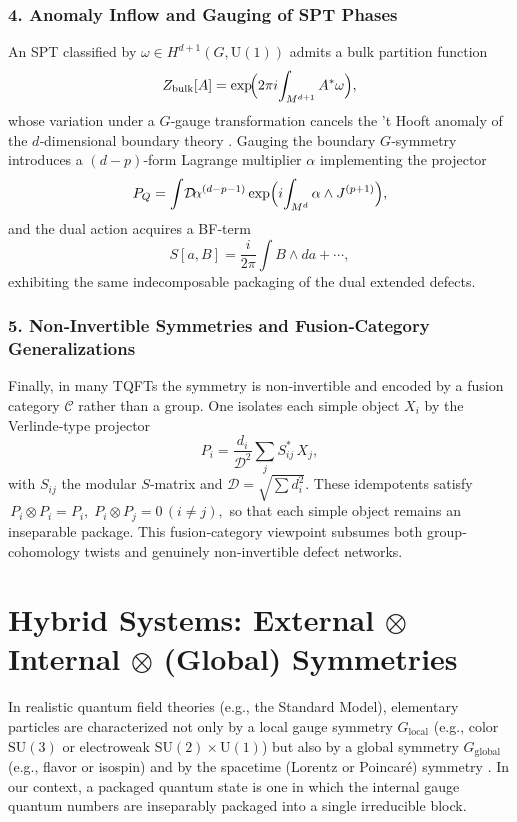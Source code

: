 \documentclass[12pt,a4paper]{article}
\begin{document}
\subsubsection*{4. Anomaly Inflow and Gauging of SPT Phases}


An SPT classified by $\omega\in H^{d+1}(G,\mathrm{U}(1))$ admits a bulk partition function
\[
Z_{\rm bulk}[A]
=\exp\!\Bigl(2\pi i\!\int_{M^{d+1}}A^*\omega\Bigr),
\]
whose variation under a $G$‐gauge transformation cancels the ’t Hooft anomaly of the $d$‐dimensional boundary theory \cite{Witten1983,CallanHarvey1985}.
Gauging the boundary $G$‐symmetry introduces a $(d\!-\!p)$-form Lagrange multiplier $\alpha$ implementing the projector
\[
P_Q
=\int\!\mathcal D\!\alpha^{(d-p-1)}
\exp\!{\Bigl(i\!\int_{M^d}\alpha\wedge J^{(p+1)}\Bigr)},
\]
and the dual action acquires a BF‐term
\[
S[a,B]
=\frac{i}{2\pi}\int B\wedge da+\cdots,
\]
exhibiting the same indecomposable packaging of the dual extended defects.



\subsubsection*{5. Non‐Invertible Symmetries and Fusion‐Category Generalizations}

Finally, in many TQFTs the symmetry is non‐invertible and encoded by a fusion category $\mathcal C$ rather than a group.
One isolates each simple object $X_i$ by the Verlinde‐type projector \cite{Etingof2005,Bakalov2001}
\[
P_i
=\frac{d_i}{\mathcal D^2}\sum_j S_{ij}^*\,X_j,
\]
with $S_{ij}$ the modular $S$‐matrix and $\mathcal D=\sqrt{\sum d_i^2}$.
These idempotents satisfy
$\,P_i\otimes P_i=P_i,\;P_i\otimes P_j=0\,(i\neq j),$
so that each simple object remains an inseparable package.
This fusion‐category viewpoint subsumes both group‐cohomology twists and genuinely non‐invertible defect networks.





\section{Hybrid Systems: External $\otimes$ Internal $\otimes$ (Global) Symmetries}
\label{SEC:HybridSystems}


In realistic quantum field theories (e.g., the Standard Model), elementary particles are characterized not only by a local gauge symmetry $G_{\mathrm{local}}$ (e.g., color $\mathrm{SU}(3)$ or electroweak $\mathrm{SU}(2)\times \mathrm{U}(1)$) \cite{Yang1954,Weinberg1967,Gross1973,Glashow1961} but also by a global symmetry $G_{\mathrm{global}}$ (e.g., flavor or isospin) \cite{GellMann1961,tHooft1980} and by the spacetime (Lorentz or Poincaré) symmetry \cite{Wigner1939,ColemanMandula1967}.
In our context, a packaged quantum state is one in which the internal gauge quantum numbers are inseparably packaged into a single irreducible block.
\end{document}
